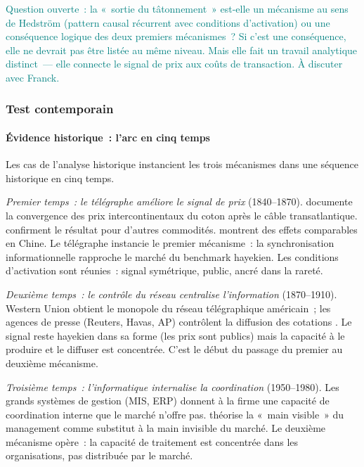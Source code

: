 \textcolor{teal}{Question ouverte~: la «~sortie du tâtonnement~» est-elle un mécanisme au sens de Hedström (pattern causal récurrent avec conditions d'activation) ou une conséquence logique des deux premiers mécanismes~? Si c'est une conséquence, elle ne devrait pas être listée au même niveau. Mais elle fait un travail analytique distinct~--- elle connecte le signal de prix aux coûts de transaction. À discuter avec Franck.}
\fi


\subsubsection{Test contemporain}

\paragraph{Évidence historique~: l'arc en cinq temps}

Les cas de l'analyse historique instancient les trois mécanismes dans une séquence historique en cinq temps.

\emph{Premier temps~: le télégraphe améliore le signal de prix} (1840--1870). \textcite{steinwender_real_2018} documente la convergence des prix intercontinentaux du coton après le câble transatlantique. \textcite{ejrnaes_gains_2010} confirment le résultat pour d'autres commodités. \textcite{gao_communication_2021} montrent des effets comparables en Chine. Le télégraphe instancie le premier mécanisme~: la synchronisation informationnelle rapproche le marché du benchmark hayekien. Les conditions d'activation sont réunies~: signal symétrique, public, ancré dans la rareté.

\emph{Deuxième temps~: le contrôle du réseau centralise l'information} (1870--1910). Western Union obtient le monopole du réseau télégraphique américain~; les agences de presse (Reuters, Havas, AP) contrôlent la diffusion des cotations \parencite{wu2010master}. Le signal reste hayekien dans sa forme (les prix sont publics) mais la capacité à le produire et le diffuser est concentrée. C'est le début du passage du premier au deuxième mécanisme.

\emph{Troisième temps~: l'informatique internalise la coordination} (1950--1980). Les grands systèmes de gestion (MIS, ERP) donnent à la firme une capacité de coordination interne que le marché n'offre pas. \textcite{chandler_visible_1977} théorise la «~main visible~» du management comme substitut à la main invisible du marché. Le deuxième mécanisme opère~: la capacité de traitement est concentrée dans les organisations, pas distribuée par le marché.

